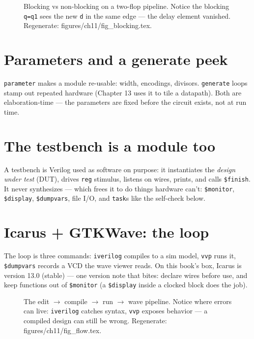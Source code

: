 \begin{figure}[htbp]
\centering

\caption{Blocking vs non-blocking on a two-flop pipeline. Notice the
blocking \texttt{q=q1} sees the new \texttt{d} in the same edge ---
the delay element vanished. Regenerate:
\ttfamily figures/ch11/fig\_blocking.tex.}
\label{fig:blocking}
\end{figure}

\section{Parameters and a generate peek}\label{sec:params}

\texttt{parameter} makes a module
re-usable: width, encodings, divisors. \texttt{generate} loops stamp
out repeated hardware (Chapter 13 uses it to tile a datapath). Both are
elaboration-time --- the parameters are fixed before the circuit
exists, not at run time.

\section{The testbench is a module too}\label{sec:tb}

 A testbench is Verilog used as software on purpose:
it instantiates the \emph{design under test} (DUT), drives \texttt{reg} stimulus, listens on wires,
prints, and calls \texttt{\$finish}. It never synthesizes --- which
frees it to do things hardware can't: \texttt{\$monitor},
\texttt{\$display}, \texttt{\$dumpvars}, file I/O, and \texttt{task}s
like the self-check below.

\section{Icarus + GTKWave: the loop}\label{sec:icarus}

 The loop is three commands: \texttt{iverilog}
compiles to a sim model, \texttt{vvp} runs it, \texttt{\$dumpvars}
records a VCD the wave viewer reads. On this book's box, Icarus is
version 13.0 (stable) --- one version note that bites: declare wires
before use, and keep functions out of \texttt{\$monitor} (a
\texttt{\$display} inside a clocked block does the job).

\begin{figure}[htbp]
\centering

\caption{The edit $\to$ compile $\to$ run $\to$ wave pipeline. Notice
where errors can live: \texttt{iverilog} catches syntax, \texttt{vvp}
exposes behavior --- a compiled design can still be wrong.
Regenerate: \ttfamily figures/ch11/fig\_flow.tex.}
\label{fig:flow11}
\end{figure}

